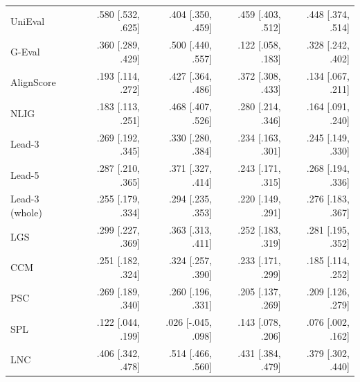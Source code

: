 \begin{table}[t]
\begin{tabular}{@{}lrrrr@{}}
UniEval & .580 {\scriptsize [.532, .625]} & .404 {\scriptsize [.350, .459]} & .459 {\scriptsize [.403, .512]} & .448 {\scriptsize [.374, .514]} \\
G-Eval & .360 {\scriptsize [.289, .429]} & .500 {\scriptsize [.440, .557]} & .122 {\scriptsize [.058, .183]} & .328 {\scriptsize [.242, .402]} \\
AlignScore & .193 {\scriptsize [.114, .272]} & .427 {\scriptsize [.364, .486]} & .372 {\scriptsize [.308, .433]} & .134 {\scriptsize [.067, .211]} \\
NLIG & .183 {\scriptsize [.113, .251]} & .468 {\scriptsize [.407, .526]} & .280 {\scriptsize [.214, .346]} & .164 {\scriptsize [.091, .240]} \\
Lead-3 & .269 {\scriptsize [.192, .345]} & .330 {\scriptsize [.280, .384]} & .234 {\scriptsize [.163, .301]} & .245 {\scriptsize [.149, .330]} \\
Lead-5 & .287 {\scriptsize [.210, .365]} & .371 {\scriptsize [.327, .414]} & .243 {\scriptsize [.171, .315]} & .268 {\scriptsize [.194, .336]} \\
Lead-3 (whole) & .255 {\scriptsize [.179, .334]} & .294 {\scriptsize [.235, .353]} & .220 {\scriptsize [.149, .291]} & .276 {\scriptsize [.183, .367]} \\
LGS & .299 {\scriptsize [.227, .369]} & .363 {\scriptsize [.313, .411]} & .252 {\scriptsize [.183, .319]} & .281 {\scriptsize [.195, .352]} \\
CCM & .251 {\scriptsize [.182, .324]} & .324 {\scriptsize [.257, .390]} & .233 {\scriptsize [.171, .299]} & .185 {\scriptsize [.114, .252]} \\
PSC & .269 {\scriptsize [.189, .340]} & .260 {\scriptsize [.196, .331]} & .205 {\scriptsize [.137, .269]} & .209 {\scriptsize [.126, .279]} \\
SPL & .122 {\scriptsize [.044, .199]} & .026 {\scriptsize [-.045, .098]} & .143 {\scriptsize [.078, .206]} & .076 {\scriptsize [.002, .162]} \\
LNC & .406 {\scriptsize [.342, .478]} & .514 {\scriptsize [.466, .560]} & .431 {\scriptsize [.384, .479]} & .379 {\scriptsize [.302, .440]} \\
\bottomrule
\end{tabular}
\end{table}
